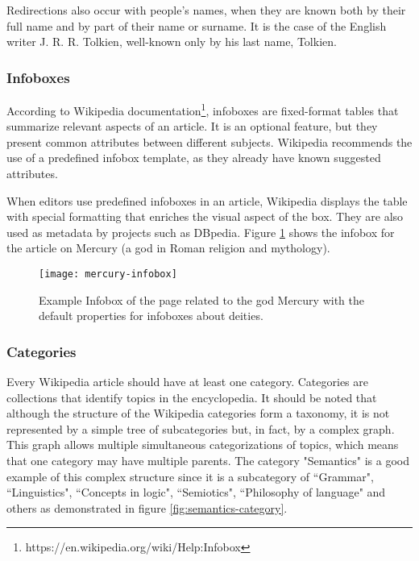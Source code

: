 Redirections also occur with people's names, when they are known both by their full name and by part of their name or surname. It is the case of the English writer  J. R. R. Tolkien, well-known only by his last name, Tolkien.

\subsubsection{\hspace*{3pt} Infoboxes}

According to Wikipedia documentation\footnote{https://en.wikipedia.org/wiki/Help:Infobox}, infoboxes are fixed-format tables that summarize relevant aspects of an article. It is an optional feature, but they present common attributes between different subjects. Wikipedia recommends the use of a predefined infobox template, as they already have known suggested attributes. 

When editors use predefined infoboxes in an article, Wikipedia displays the table with special formatting that enriches the visual aspect of the box. They are also used as metadata by projects such as DBpedia. Figure \ref{fig:mercury-infobox} shows the infobox for the article on Mercury (a god in Roman religion and mythology).%



\begin{figure}[!h]
\centering
  \texttt{[image: mercury-infobox]}
  \caption{Example Infobox of the page related to the god Mercury with the default properties for infoboxes about deities.}
  \label{fig:mercury-infobox}
\end{figure}



\subsubsection{\hspace*{3pt} Categories}

Every Wikipedia article should have at least one category. Categories are collections that identify topics in the encyclopedia. It should be noted that although the structure of the Wikipedia categories form a taxonomy, it is not represented by a simple tree of subcategories but, in fact, by a complex graph. This graph allows multiple simultaneous categorizations of topics, which means that one category may have multiple parents. The category "Semantics" is a good example of this complex structure since it is a subcategory of ``Grammar",  ``Linguistics", ``Concepts in logic", ``Semiotics", ``Philosophy of language" and others as demonstrated in figure \ref{fig:semantics-category}.



